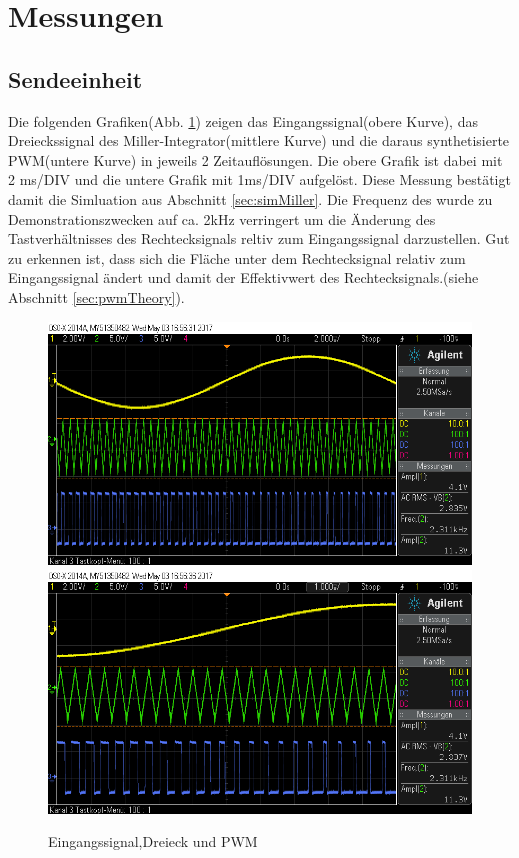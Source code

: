 \section{Messungen}

\subsection{Sendeeinheit}
Die folgenden Grafiken(Abb. \ref{fig:measMiller}) zeigen das Eingangssignal(obere Kurve), das Dreieckssignal des Miller-Integrator(mittlere Kurve) und die daraus synthetisierte PWM(untere Kurve) in jeweils 2 Zeitauflösungen. Die obere Grafik ist dabei mit 2 ms/DIV und die untere Grafik mit 1ms/DIV aufgelöst. Diese Messung bestätigt damit die Simluation aus Abschnitt \ref{sec:simMiller}. Die Frequenz des wurde zu Demonstrationszwecken auf ca. 2kHz verringert um die Änderung des Tastverhältnisses des Rechtecksignals reltiv zum Eingangssignal darzustellen. Gut zu erkennen ist, dass sich die Fläche unter dem Rechtecksignal relativ zum Eingangssignal ändert und damit der Effektivwert des Rechtecksignals.(siehe Abschnitt \ref{sec:pwmTheory}).
\begin{figure}[H]
	\centering
	\includegraphics[scale=0.5]{gfx/osziScreens/scope_3.png}
	\includegraphics[scale=0.5]{gfx/osziScreens/scope_4.png}
	\caption{Eingangssignal,Dreieck und PWM}
	\label{fig:measMiller}
\end{figure}
